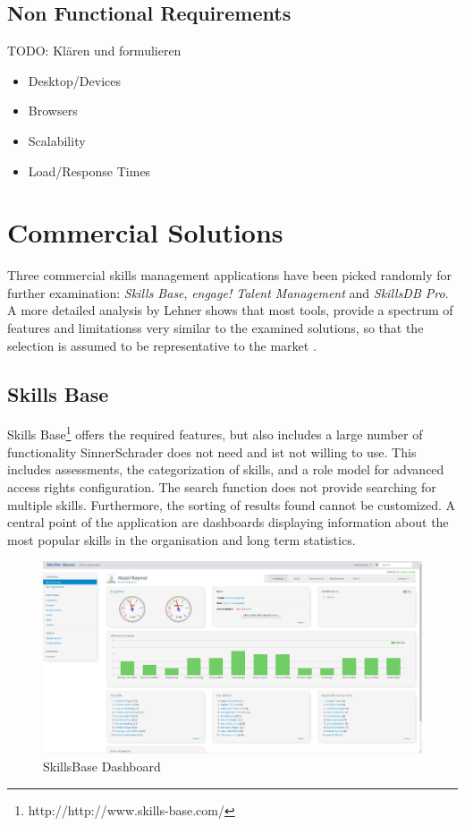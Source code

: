 \subsection{Non Functional Requirements}
TODO: Klären und formulieren
\begin{itemize}
	\item Desktop/Devices
	\item Browsers
	\item Scalability
	\item Load/Response Times
\end{itemize}



\section{Commercial Solutions}
\label{commercial}
Three commercial skills management applications have been picked randomly for further examination: \textit{Skills Base}, \textit{engage! Talent Management} and \textit{SkillsDB Pro}.
A more detailed analysis by Lehner shows that most tools, provide a spectrum of features and limitationss very similar to the examined solutions, so that the selection is assumed to be representative to the market \cite{Marktanalyse}.

\subsection{Skills Base}
Skills Base\footnote{http://http://www.skills-base.com/} offers the required features, but also includes a large number of functionality SinnerSchrader does not need and ist not willing to use. This includes assessments, the categorization of skills, and a role model for advanced access rights configuration.
The search function does not provide searching for multiple skills. Furthermore, the sorting of results found cannot be customized. A central point of the application are dashboards displaying information about the most popular skills in the organisation and long term statistics.
\begin{figure}[!htp]
    \centering
    \includegraphics[width=\textwidth]{images/skillsbase-dashboard.png}
    \caption{SkillsBase Dashboard}
    \label{fig:skillsbase_dashboard}
\end{figure}

